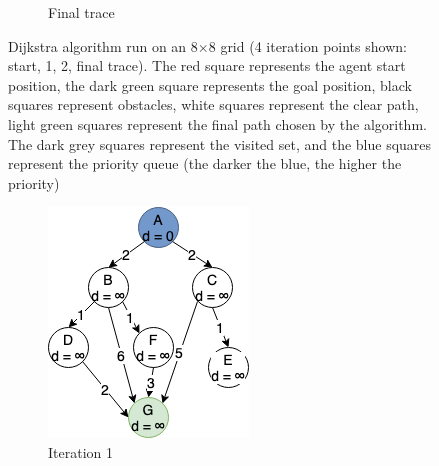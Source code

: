 \begin{figure}[h!]
\begin{subfigure}[b]{0.2\linewidth}
    \caption{Final trace}
  \end{subfigure}
  \caption{Dijkstra algorithm run on an 8$\times$8 grid (4 iteration points shown: start, 1, 2, final trace). The red square represents the agent start position, the dark green square represents the goal position, black squares represent obstacles, white squares represent the clear path, light green squares represent the final path chosen by the algorithm. The dark grey squares represent the visited set, and the blue squares represent the priority queue (the darker the blue, the higher the priority)}
  \label{fig:dijkstra}
\end{figure}

\begin{figure}[h!]
  \centering
  \begin{subfigure}[b]{0.2\linewidth}
    \includegraphics[width=\linewidth]{images/dijkstra_expansion1.png}
     \caption{Iteration 1}
  \end{subfigure}
  \hfill
  \begin{subfigure}[b]{0.2\linewidth}

\end{subfigure}
\end{figure}
